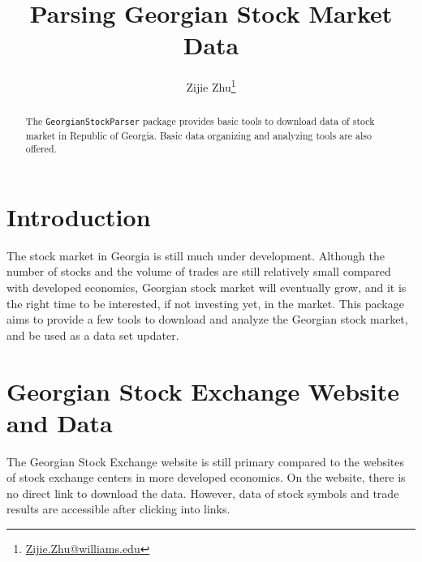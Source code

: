 \documentclass[a4paper]{article}
\begin{document}





\renewcommand\Authfont{\fontsize{12}{14.4}\selectfont}
\renewcommand\Affilfont{\fontsize{9}{10.8}\itshape}

\title{\textbf{Parsing Georgian Stock Market Data}}
\author{Zijie Zhu\thanks{\href{mailto:Zijie.Zhu@williams.edu}{Zijie.Zhu@williams.edu}}}
\maketitle


\tableofcontents

\begin{abstract}
The \texttt{GeorgianStockParser} package provides basic tools to download data of stock market in Republic of Georgia. Basic data organizing and analyzing tools are also offered.
\end{abstract}
\newpage
\section{Introduction}
\label{sec:Introduction}

The stock market in Georgia is still much under development. Although the number of stocks and the volume of trades are still relatively small compared with developed economics, Georgian stock market will eventually grow, and it is the right time to be interested, if not investing yet, in the market. This package aims to provide a few tools to download and analyze the Georgian stock market, and be used as a data set updater.

\section{Georgian Stock Exchange Website and Data}
\label{sec:GSE}

The Georgian Stock Exchange website is still primary compared to the websites of stock exchange centers in more developed economics. On the website, there is no direct link to download the data. However, data of stock symbols and trade results are accessible after clicking into links.
\end{document}
